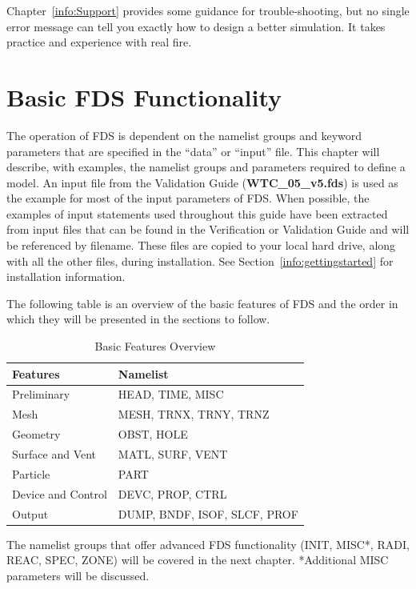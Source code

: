 \documentclass[11pt]{book}
\begin{document}
Chapter~\ref{info:Support} provides some guidance for trouble-shooting, but no single error message can tell you exactly how to design a
better simulation. It takes practice and experience with real fire.




\chapter{Basic FDS Functionality}
\label{info:fdsBasic}

The operation of FDS is dependent on the namelist groups and keyword
parameters that are specified in the ``data'' or ``input'' file.  This chapter will describe,
with examples, the namelist groups and parameters required to define a model.
An input file from the Validation Guide ({\bf WTC\_05\_v5.fds}) is used as the example
for most of the input parameters of FDS.  When possible, the examples of input statements used
throughout this guide have been extracted from input files that can be found in the
Verification or Validation Guide and will be referenced by filename.  These files are copied
to your local hard drive, along with all the other files, during installation. See
Section~\ref{info:gettingstarted} for installation information.


The following table is an overview of the basic features of FDS and
the order in which they will be presented in the sections to follow.

\begin{table}[ht]
\begin{center}
\caption{Basic Features Overview}
\label{tab:fdsBasic}
\vspace{\baselineskip}
\begin{tabular}{|l|l|}
\hline
Features            & Namelist                      \\ \hline
\hline
Preliminary         & HEAD, TIME, MISC              \\ \hline
Mesh                & MESH, TRNX, TRNY, TRNZ        \\ \hline
Geometry            & OBST, HOLE                    \\ \hline
Surface and Vent    & MATL, SURF, VENT              \\ \hline
Particle            & PART                          \\ \hline
Device and Control  & DEVC, PROP, CTRL              \\ \hline
Output              & DUMP, BNDF, ISOF, SLCF, PROF  \\ \hline
\end{tabular}
\end{center}
\end{table}
\noindent
The namelist groups that offer advanced FDS functionality (INIT, MISC*, RADI, REAC, SPEC, ZONE)
will be covered in the next chapter. *Additional MISC parameters will be discussed.
\end{document}
